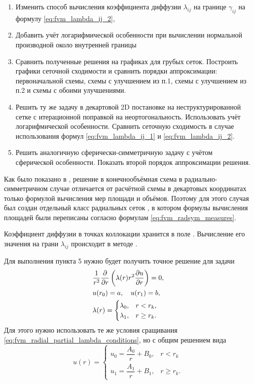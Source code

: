 \begin{enumerate}
\item Изменить способ вычисления коэффициента диффузии $\lambda_{ij}$ на границе $\gamma_{ij}$ на формулу \cref{eq:fvm_lambda_ij_2},
\item Добавить учёт логарифмической особенности при вычислении нормальной производной около внутренней границы
\item Сравнить полученные решения на графиках для грубых сеток.
      Построить графики сеточной сходимости и сравнить порядки аппроксимации: первоначальной схемы, схемы с улучшением из п.1, схемы с улучшением из п.2 и схемы с обоими улучшениями.
\item Решить ту же задачу в декартовой 2D постановке на неструктурированной сетке с итерационной поправкой на неортогональность.
      Использовать учёт логарифмической особенности.
      Сравнить сеточную сходимость в случае использования формул \cref{eq:fvm_lambda_ij_1} и \cref{eq:fvm_lambda_ij_2}.
\item Решить аналогичную сферически-симметричную задачу с учётом сферической особенности. Показать второй порядок аппроксимации решения.
\end{enumerate}

Как было показано в ,
решение в конечнообъёмная схема в радиально-симметричном случае
отличается от расчётной схемы в декартовых координатах только формулой вычисления
мер площади и объёмов.
Поэтому для этого случая был создан отдельный класс радиальных сеток ,
в котором формулы вычисления площадей были переписаны согласно формулам \cref{eq:fvm_radsym_measures}.

Коэффициент диффузии в точках коллокации хранится в поле .
Вычисление его значения на грани $\lambda_{ij}$ происходит в методе .

Для выполнения пункта 5 нужно будет получить точное решение для задачи
\begin{align*}
&\frac1{r^2}\frac{\partial }{\partial r}\left(\lambda(r) r^2\frac{\partial u}{\partial r}\right) = 0, \\
&u(r_0) = a, \quad u(r_1) = b,\\
&\lambda(r) = \begin{cases}
\lambda_0, & r < r_k,\\
\lambda_1, & r \geq r_k.\\
\end{cases}
\end{align*}
Для этого нужно использовать те же условия сращивания
\cref{eq:fvm_radial_partial_lambda_conditions},
но с общим решением вида
\begin{equation*}
u(r) = 
\begin{cases}
u_{0} = \dfrac{A_0}r + B_0, & r < r_k\\[10pt]
u_{1} = \dfrac{A_1}r + B_1, & r \geq r_k.
\end{cases}
\end{equation*}


